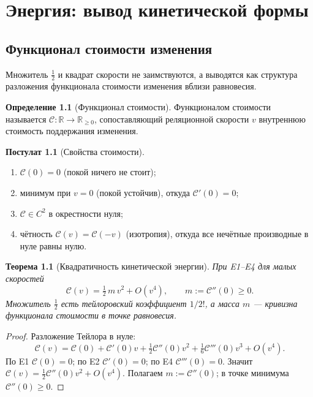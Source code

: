 \documentclass[12pt,a4paper,oneside]{book}
\theoremstyle{definition}
\newtheorem{definition}{Определение}[chapter]
\newtheorem{postulate}{Постулат}[chapter]
\theoremstyle{plain}
\newtheorem{theorem}{Теорема}[chapter]
\theoremstyle{remark}
\newcommand{\Cost}{\mathcal C}
\begin{document}
\chapter{Энергия: вывод кинетической формы}

\section{Функционал стоимости изменения}

Множитель $\tfrac12$ и квадрат скорости не заимствуются, а выводятся как структура
разложения функционала стоимости изменения вблизи равновесия.

\begin{definition}[Функционал стоимости]
Функционалом стоимости называется $\Cost:\mathbb R\to\mathbb R_{\ge0}$,
сопоставляющий реляционной скорости $v$ внутреннюю стоимость поддержания изменения.
\end{definition}

\begin{postulate}[Свойства стоимости]\label{post:cost}
\begin{enumerate}
    \item[(E1)] $\Cost(0)=0$ (покой ничего не стоит);
    \item[(E2)] минимум при $v=0$ (покой устойчив), откуда $\Cost'(0)=0$;
    \item[(E3)] $\Cost\in C^2$ в окрестности нуля;
    \item[(E4)] чётность $\Cost(v)=\Cost(-v)$ (изотропия), откуда все нечётные
    производные в нуле равны нулю.
\end{enumerate}
\end{postulate}

\begin{theorem}[Квадратичность кинетической энергии]\label{thm:kinetic}
При E1--E4 для малых скоростей
\[
\Cost(v)=\tfrac12\,m\,v^2+O(v^4),\qquad m:=\Cost''(0)\ge0.
\]
Множитель $\tfrac12$ есть тейлоровский коэффициент $1/2!$, а масса $m$ --- кривизна
функционала стоимости в точке равновесия.
\end{theorem}

\begin{proof}
Разложение Тейлора в нуле:
\[
\Cost(v)=\Cost(0)+\Cost'(0)v+\tfrac12\Cost''(0)v^2+\tfrac16\Cost'''(0)v^3+O(v^4).
\]
По E1 $\Cost(0)=0$; по E2 $\Cost'(0)=0$; по E4 $\Cost'''(0)=0$. Значит
$\Cost(v)=\tfrac12\Cost''(0)v^2+O(v^4)$. Полагаем $m:=\Cost''(0)$; в точке минимума
$\Cost''(0)\ge0$.
\end{proof}
\end{document}
